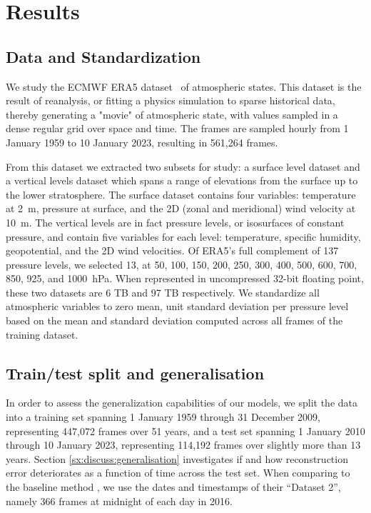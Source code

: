 \section{Results}
\label{sx:experiments}

\subsection{Data and Standardization}
We study the ECMWF ERA5 dataset~\citep{era5} of atmospheric states. This dataset is the result of reanalysis, or fitting a physics simulation to sparse historical data, thereby generating a "movie" of atmospheric state, with values sampled in a dense regular grid over space and time. The frames are sampled hourly from 1 January 1959 to 10 January 2023, resulting in 561,264 frames.

From this dataset we extracted two subsets for study: a surface level dataset and a vertical levels dataset which spans a range of elevations from the surface up to the lower stratosphere. The surface dataset contains four variables: temperature at 2~m, pressure at surface, and the 2D (zonal and meridional) wind velocity at 10~m. The vertical levels are in fact pressure levels, or isosurfaces of constant pressure, and contain five variables for each level: temperature, specific humidity, geopotential, and the 2D wind velocities. 
Of ERA5's full complement of 137 pressure levels, we selected 13, at 50, 100, 150, 200, 250, 300, 400, 500, 600, 700, 850, 925, and 1000~hPa. When represented in uncompressed 32-bit floating point, these two datasets are 6 TB and 97 TB respectively.
We standardize all atmospheric variables to zero mean, unit standard deviation per pressure level based on the mean and standard deviation computed across all frames of the training dataset.

\subsection{Train/test split and generalisation}

In order to assess the generalization capabilities of our models, we split the data into a training set spanning 1 January 1959 through 31 December 2009, representing 447,072 frames over 51 years, and a test set spanning 1 January 2010 through 10 January 2023, representing 114,192 frames over slightly more than 13 years. Section \ref{sx:discuss:generalisation} investigates if and how reconstruction error deteriorates as a function of time across the test set.
%
When comparing to the baseline method \citep{huang2022compressing}, we use the dates and timestamps of their ``Dataset 2'', namely 366 frames at midnight of each day in 2016.

